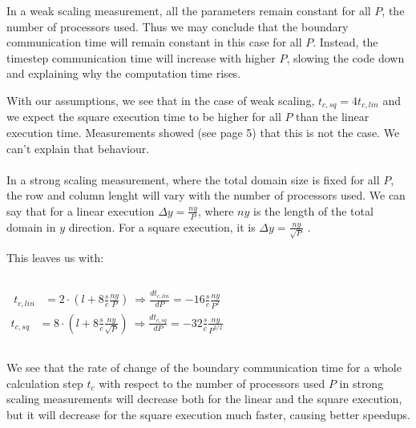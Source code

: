 \documentclass[8pt]{beamer}
\begin{document}
\begin{frame}
	In a weak scaling measurement, all the parameters remain constant for all $P$, the number of processors used. Thus we may conclude that the boundary communication time will remain constant in this case for all $P$. Instead, the timestep communication time will increase with higher $P$, slowing the code down and explaining why the computation time rises.
	
	With our assumptions, we see that in the case of weak scaling, $t_{c,sq} = 4 t_{c,lin}$ and we expect the square execution time to be higher for all $P$ than the linear execution time. Measurements showed (see page 5) that this is not the case. We can't explain that behaviour.\\~\\
	
	In a strong scaling measurement, where the total domain size is fixed for all $P$, the row and column lenght will vary with the number of processors used. We can say that for a linear execution $\Delta y = \tfrac{ny}{P}$, where $ny$ is the length of the total domain in $y$ direction. For a square execution, it is $\Delta y = \tfrac{ny}{\sqrt{P}}$ .
	
	This leaves us with:
	\begin{columns}
			\begin{align*}
				t_{c,lin} &= 2 \cdot (l + 8 \tfrac{s}{c}\tfrac{ny}{P}) 	\ \Rightarrow \tfrac{dt_{c,lin}}{dP} = - 16 \tfrac{s}{c}\tfrac{ny}{P^2}
			\end{align*}
			\begin{align*}
				t_{c,sq} &= 8 \cdot (l + 8 \tfrac{s}{c}\tfrac{ny}{\sqrt{P}} ) 	 \ \Rightarrow \tfrac{dt_{c,sq}}{dP} = - 32 \tfrac{s}{c}\tfrac{ny}{P^{3/2}} 
			\end{align*}
	\end{columns}
	
	\vspace{1mm}
	We see that the rate of change of the boundary communication time for a whole calculation step $t_c$ with respect to the number of processors used $P$ in strong scaling measurements will decrease both for the linear and the square execution, but it will decrease for the square execution much faster, causing better speedups.
\end{frame}



\end{document}
